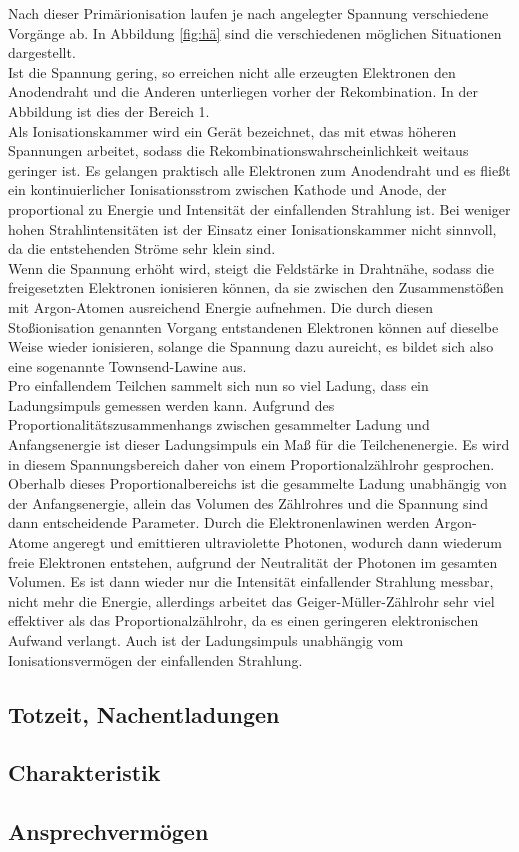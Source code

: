 Nach dieser Primärionisation laufen je nach angelegter Spannung verschiedene
Vorgänge ab. In Abbildung \ref{fig:hä} sind die verschiedenen möglichen
Situationen dargestellt.\\
Ist die Spannung gering, so erreichen nicht alle erzeugten Elektronen den Anodendraht
und die Anderen unterliegen vorher der Rekombination. In der Abbildung ist
dies der Bereich 1.\\
Als Ionisationskammer wird ein Gerät bezeichnet, das mit etwas höheren Spannungen
arbeitet, sodass die Rekombinationswahrscheinlichkeit weitaus geringer ist.
Es gelangen praktisch alle Elektronen zum Anodendraht und es fließt ein kontinuierlicher
Ionisationsstrom zwischen Kathode und Anode, der proportional zu Energie und
Intensität der einfallenden Strahlung ist. Bei weniger hohen Strahlintensitäten
ist der Einsatz einer Ionisationskammer nicht sinnvoll, da die entstehenden Ströme 
sehr klein sind.\\
Wenn die Spannung erhöht wird, steigt die Feldstärke in Drahtnähe, sodass die 
freigesetzten Elektronen ionisieren können, da sie zwischen den Zusammenstößen 
mit Argon-Atomen ausreichend Energie aufnehmen. Die durch diesen Stoßionisation genannten
Vorgang entstandenen Elektronen können auf dieselbe Weise wieder ionisieren,
solange die Spannung dazu aureicht, es bildet sich also eine sogenannte Townsend-Lawine
aus. \\
Pro einfallendem Teilchen sammelt sich nun so viel Ladung, dass ein Ladungsimpuls 
gemessen werden kann. Aufgrund des Proportionalitätszusammenhangs zwischen
gesammelter Ladung und Anfangsenergie ist dieser Ladungsimpuls ein Maß für 
die Teilchenenergie. Es wird in diesem Spannungsbereich daher von einem 
Proportionalzählrohr gesprochen.\\
Oberhalb dieses Proportionalbereichs ist die gesammelte Ladung unabhängig 
von der Anfangsenergie, allein das Volumen des Zählrohres und die Spannung sind
dann entscheidende Parameter. Durch die Elektronenlawinen werden Argon-Atome angeregt
und emittieren ultraviolette Photonen, wodurch dann wiederum 
freie Elektronen entstehen, aufgrund der Neutralität der Photonen im gesamten Volumen.
Es ist dann wieder nur die Intensität einfallender Strahlung messbar, nicht mehr
die Energie, allerdings arbeitet das Geiger-Müller-Zählrohr sehr viel effektiver als
das Proportionalzählrohr, da es einen geringeren elektronischen Aufwand verlangt.
Auch ist der Ladungsimpuls unabhängig vom Ionisationsvermögen der einfallenden Strahlung.

\subsection{Totzeit, Nachentladungen}

\subsection{Charakteristik}

\subsection{Ansprechvermögen}
